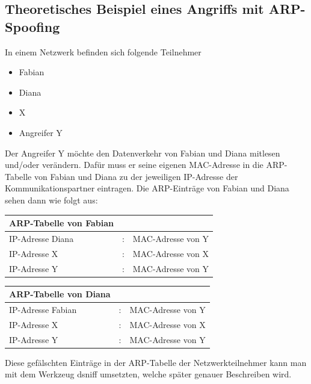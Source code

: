 \subsection{Theoretisches Beispiel eines Angriffs mit ARP-Spoofing}
In einem Netzwerk befinden sich folgende Teilnehmer
\begin{itemize}
	\item Fabian
	\item Diana
	\item X
	\item Angreifer Y
\end{itemize}
Der Angreifer Y möchte den Datenverkehr von Fabian und Diana mitlesen und/oder verändern. Dafür muss er seine eigenen MAC-Adresse in die ARP-Tabelle von Fabian und Diana zu der jeweiligen IP-Adresse der Kommunikationspartner eintragen. Die ARP-Einträge von Fabian und Diana sehen dann wie folgt aus:
\vfill
\begin{tabular}{l c l}
	ARP-Tabelle von Fabian & & \\
	\hline
	IP-Adresse Diana & : & MAC-Adresse von Y \\
	IP-Adresse X & : & MAC-Adresse von X \\
	IP-Adresse Y & : & MAC-Adresse von Y \\
\end{tabular}
\vfill
\begin{tabular}{l c l}
	ARP-Tabelle von Diana & & \\
	\hline
	IP-Adresse Fabian & : & MAC-Adresse von Y \\
	IP-Adresse X & : & MAC-Adresse von X \\
	IP-Adresse Y & : & MAC-Adresse von Y \\
\end{tabular}
\vfill
Diese gefälschten Einträge in der ARP-Tabelle der Netzwerkteilnehmer kann man mit dem Werkzeug dsniff umsetzten, welche später genauer Beschreiben wird.

